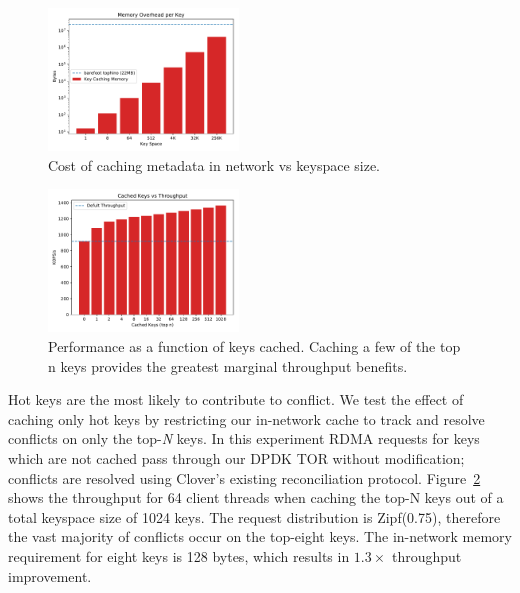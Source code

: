 \begin{figure}
    \includegraphics[width=0.45\textwidth]{fig/memory.pdf}
    \caption{Cost of caching metadata in network vs keyspace size.}
    \label{fig:memory}
\end{figure}
\begin{figure}
    \includegraphics[width=0.45\textwidth]{fig/cache.pdf}
    \caption{Performance as a function of keys cached. Caching a few
    of the top n keys provides the greatest marginal throughput
    benefits.}
    \label{fig:cache}
\end{figure}

Hot keys are the most likely to
contribute to conflict.
We test the effect of
caching only hot keys by restricting our in-network cache to track and
resolve conflicts on only the top-\textit{N} keys. In this experiment
RDMA requests for keys which are not cached pass through our DPDK TOR
without modification; conflicts are resolved using Clover's existing
reconciliation protocol. Figure~\ref{fig:cache} shows
the throughput for 64 client threads when caching the top-N keys out of a total keyspace size of 1024 keys. The request
distribution is Zipf(0.75), therefore the vast majority of conflicts
occur on the top-eight keys. The in-network memory requirement for eight keys
is 128 bytes, which results in $1.3\times$ throughput improvement.


